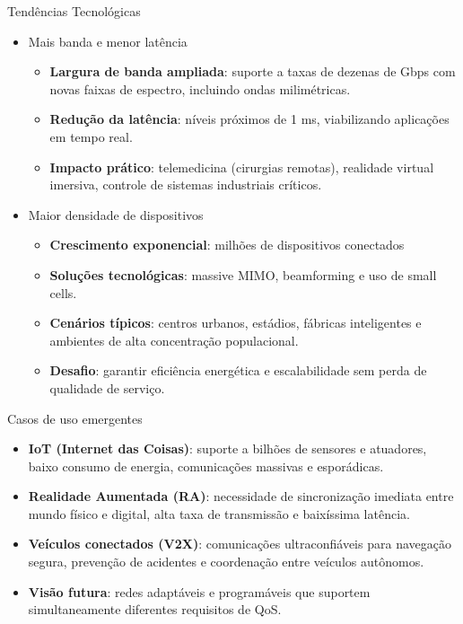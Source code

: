 \begin{frame}{Tendências Tecnológicas}
\begin{itemize}
  \item Mais banda e menor latência
  \begin{itemize}
    \item \textbf{Largura de banda ampliada}: suporte a taxas de dezenas de Gbps com novas faixas de espectro, incluindo ondas milimétricas.  
    \item \textbf{Redução da latência}: níveis próximos de 1 ms, viabilizando aplicações em tempo real.  
    \item \textbf{Impacto prático}: telemedicina (cirurgias remotas), realidade virtual imersiva, controle de sistemas industriais críticos.  
  \end{itemize}
  \item Maior densidade de dispositivos
  \begin{itemize}
    \item \textbf{Crescimento exponencial}: milhões de dispositivos conectados%
    \item \textbf{Soluções tecnológicas}: massive MIMO, beamforming e uso de small cells.  
    \item \textbf{Cenários típicos}: centros urbanos, estádios, fábricas inteligentes e ambientes de alta concentração populacional.  
    \item \textbf{Desafio}: garantir eficiência energética e escalabilidade sem perda de qualidade de serviço.  
  \end{itemize}
\end{itemize}
\end{frame}

\begin{frame}{Casos de uso emergentes}
\begin{itemize}
  \item \textbf{IoT (Internet das Coisas)}: suporte a bilhões de sensores e atuadores, baixo consumo de energia, comunicações massivas e esporádicas.  
  \item \textbf{Realidade Aumentada (RA)}: necessidade de sincronização imediata entre mundo físico e digital, alta taxa de transmissão e baixíssima latência.  
  \item \textbf{Veículos conectados (V2X)}: comunicações ultraconfiáveis para navegação segura, prevenção de acidentes e coordenação entre veículos autônomos.  
  \item \textbf{Visão futura}: redes adaptáveis e programáveis que suportem simultaneamente diferentes requisitos de QoS.  
\end{itemize}
\end{frame}


